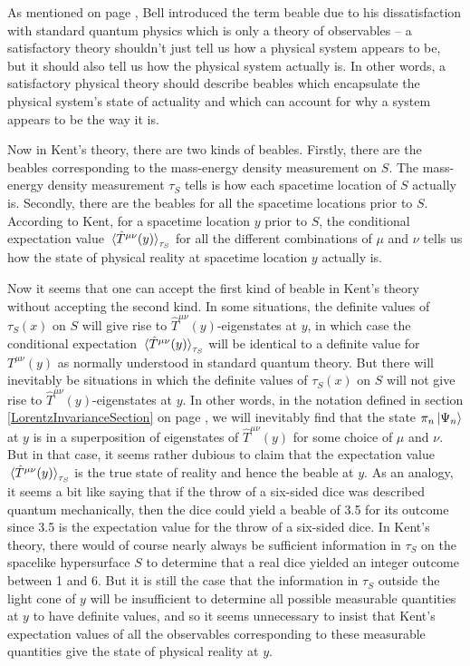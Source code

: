 As mentioned on page \pageref{beabledef}, Bell introduced the term beable due to his dissatisfaction with standard quantum physics which is only a theory of observables -- a satisfactory theory shouldn't just tell us how a physical system appears to be, but it should also tell us how the physical system actually is. In other words, a satisfactory physical theory should describe beables which encapsulate the physical system's state of actuality and which can account for why a system appears to be the way it is. 

Now in Kent's theory, there are two kinds of beables. Firstly, there are the beables corresponding to the mass-energy density measurement on $S$. The mass-energy density measurement $\tau_S$ tells is how each spacetime location of $S$ actually is. Secondly, there are the beables for all the spacetime locations prior to $S$. According to Kent, for a spacetime location $y$ prior to $S$, the conditional expectation value  $\ev*{\hat{T}^{\mu\nu}(y)}_{\tau_S}$ for all the different combinations of $\mu$ and $\nu$ tells us how the state of physical reality at spacetime location $y$ actually is. 

Now it seems that one can accept the first kind of beable in Kent's theory without accepting the second kind. In some situations, the definite values of $\tau_S(x)$ on $S$ will give rise to $\hat{T}^{\mu\nu}(y)$-eigenstates at $y$, in which case the conditional expectation $\ev*{\hat{T}^{\mu\nu}(y)}_{\tau_S}$ will be identical to a definite value for $T^{\mu\nu}(y)$ as normally understood in standard quantum theory. But there will inevitably be situations in which the definite values of $\tau_S(x)$ on $S$ will not give rise to  $\hat{T}^{\mu\nu}(y)$-eigenstates at $y$. In other words, in the notation defined in section \ref{LorentzInvarianceSection} on page \pageref{tauprojection}, we will inevitably find that the state $\pi_n\ket{\Psi_n}$ at $y$ is in a superposition of eigenstates of $\hat{T}^{\mu\nu}(y)$ for some choice of $\mu$ and $\nu$. But in that case, it seems rather dubious to claim that the expectation value $\ev*{\hat{T}^{\mu\nu}(y)}_{\tau_S}$ is the true state of reality and hence the beable at $y$. As an analogy, it seems a bit like saying that if the throw of a six-sided dice was described quantum mechanically, then the dice could yield a beable of 3.5 for its outcome since 3.5 is the expectation value for the throw of a six-sided dice. In Kent's theory, there would of course nearly always be sufficient information in $\tau_S$ on the spacelike hypersurface $S$  to determine that a real dice yielded an integer outcome between 1 and 6.  But it is still the case that the information in $\tau_S$ outside the light cone of $y$ will be insufficient to determine all possible measurable quantities at $y$ to have definite values, and so it seems unnecessary to insist that Kent's expectation values of all the observables corresponding to these measurable quantities give the state of physical reality at $y$. 

